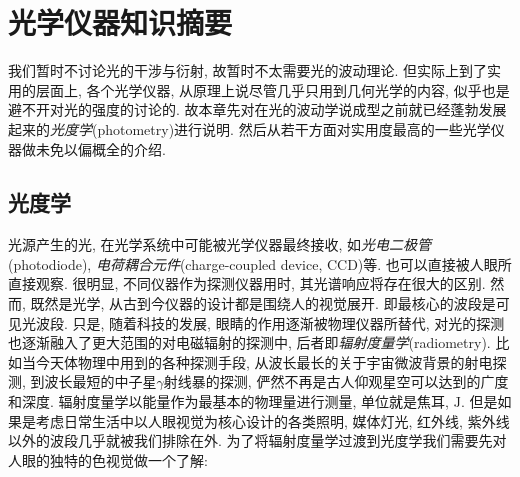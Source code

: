 \chapter{光学仪器知识摘要}


我们暂时不讨论光的干涉与衍射, 故暂时不太需要光的波动理论. 但实际上到了实用的层面上, 各个光学仪器, 从原理上说尽管几乎只用到几何光学的内容, 似乎也是避不开对光的强度的讨论的. 故本章先对在光的波动学说成型之前就已经蓬勃发展起来的\emph{光度学}(photometry)进行说明. 然后从若干方面对实用度最高的一些光学仪器做未免以偏概全的介绍.



\section{光度学}


光源产生的光, 在光学系统中可能被光学仪器最终接收, 如\emph{光电二极管}(photodiode), \emph{电荷耦合元件}(charge-coupled device, CCD)等. 也可以直接被人眼所直接观察. 很明显, 不同仪器作为探测仪器用时, 其光谱响应将存在很大的区别. 然而, 既然是光学, 从古到今仪器的设计都是围绕人的视觉展开. 即最核心的波段是可见光波段. 只是, 随着科技的发展, 眼睛的作用逐渐被物理仪器所替代, 对光的探测也逐渐融入了更大范围的对电磁辐射的探测中, 后者即\emph{辐射度量学}(radiometry). 比如当今天体物理中用到的各种探测手段, 从波长最长的关于宇宙微波背景的射电探测, 到波长最短的中子星$\gamma$射线暴的探测, 俨然不再是古人仰观星空可以达到的广度和深度. 辐射度量学以能量作为最基本的物理量进行测量, 单位就是焦耳, $\mathrm{J}$. 但是如果是考虑日常生活中以人眼视觉为核心设计的各类照明, 媒体灯光, 红外线, 紫外线以外的波段几乎就被我们排除在外. 为了将辐射度量学过渡到光度学我们需要先对人眼的独特的色视觉做一个了解:

